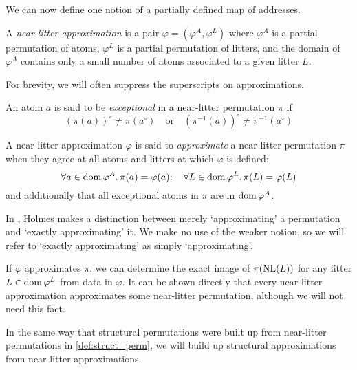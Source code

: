 We can now define one notion of a partially defined map of addresses.

\begin{definition}
    A \emph{near-litter approximation} is a pair \( \varphi = (\varphi^A, \varphi^L) \) where \( \varphi^A \) is a partial permutation of atoms, \( \varphi^L \) is a partial permutation of litters, and the domain of \( \varphi^A \) contains only a small number of atoms associated to a given litter \( L \).
\end{definition}

For brevity, we will often suppress the superscripts on approximations.

\begin{definition}
    An atom \( a \) is said to be \emph{exceptional} in a near-litter permutation \( \pi \) if \[ (\pi(a))^\circ \neq \pi(a^\circ) \quad\text{or}\quad (\pi^{-1}(a))^\circ \neq \pi^{-1}(a^\circ) \]
\end{definition}
\begin{definition}
    A near-litter approximation \( \varphi \) is said to \emph{approximate} a near-litter permutation \( \pi \) when they agree at all atoms and litters at which \( \varphi \) is defined:
    \[ \forall a \in \operatorname{dom} \varphi^A.\, \pi(a) = \varphi(a);\quad \forall L \in \operatorname{dom} \varphi^L.\, \pi(L) = \varphi(L) \]
    and additionally that all exceptional atoms in \( \pi \) are in \( \operatorname{dom} \varphi^A \).
\end{definition}

\begin{remark}
    In \cite{holmes2023nf}, Holmes makes a distinction between merely `approximating' a permutation and `exactly approximating' it.
    We make no use of the weaker notion, so we will refer to `exactly approximating' as simply `approximating'.
\end{remark}

\begin{remark}
    If \( \varphi \) approximates \( \pi \), we can determine the exact image of \( \pi(\operatorname{NL}(L)) \) for any litter \( L \in \operatorname{dom} \varphi^L \) from data in \( \varphi \).
    It can be shown directly that every near-litter approximation approximates some near-litter permutation, although we will not need this fact.
\end{remark}

In the same way that structural permutations were built up from near-litter permutations in \cref{def:struct_perm}, we will build up structural approximations from near-litter approximations.

